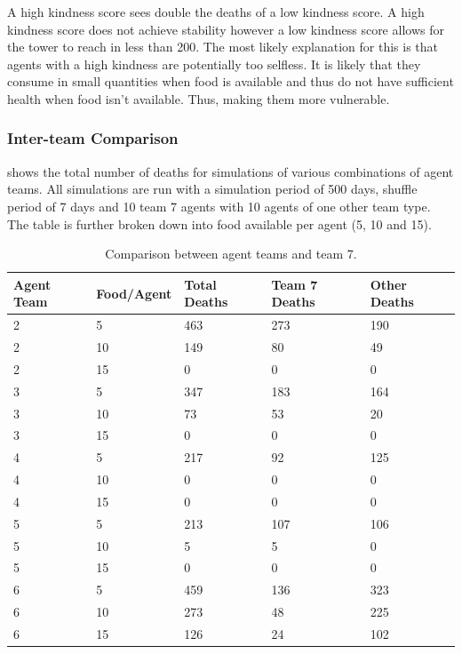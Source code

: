 A high kindness score sees double the deaths of a low kindness score. A high kindness score does not achieve stability however a low kindness score allows for the tower to reach in less than 200. The most likely explanation for this is that agents with a high kindness are potentially too selfless. It is likely that they consume in small quantities when food is available and thus do not have sufficient health when food isn't available. Thus, making them more vulnerable.

\subsubsection{Inter-team Comparison}
 shows the total number of deaths for simulations of various combinations of agent teams. All simulations are run with a simulation period of 500 days, shuffle period of 7 days and 10 team 7 agents with 10 agents of one other team type. The table is further broken down into food available per agent (5, 10 and 15).

\begin{table}
    \begin{center}
    \begin{tabular} { | m{4em} | m{6em} | m{4em} | m{4em} | m{4em} | }
        \hline
        \textbf{Agent Team} & \textbf{Food/Agent} & \textbf{Total Deaths} & \textbf{Team 7 Deaths} & \textbf{Other Deaths} \\
        \hline
        2 & 5 & 463 & 273 & 190 \\
        \hline
        2 & 10 & 149 & 80 & 49 \\
        \hline
        2 & 15 & 0 & 0 & 0 \\
        \hline
        3 & 5 & 347 & 183 & 164\\
        \hline
        3 & 10 & 73 & 53 & 20\\
        \hline
        3 & 15 & 0 & 0 & 0 \\
        \hline
        4 & 5 & 217 & 92 & 125\\
        \hline
        4 & 10 & 0 & 0 & 0 \\
        \hline
        4 & 15 & 0 & 0 & 0 \\
        \hline
        5 & 5 & 213 & 107 & 106 \\
        \hline
        5 & 10 & 5 & 5 & 0 \\
        \hline
        5 & 15 &  0 & 0 & 0 \\ 
        \hline
        6 & 5 & 459 & 136 & 323 \\
        \hline
        6 & 10 & 273 & 48 & 225 \\
        \hline
        6 & 15 & 126 & 24 & 102 \\
        \hline
    \end{tabular}
    \end{center}
    \caption{Comparison between agent teams and team 7.}
    \label{tab: Inter-team data}
\end{table}

